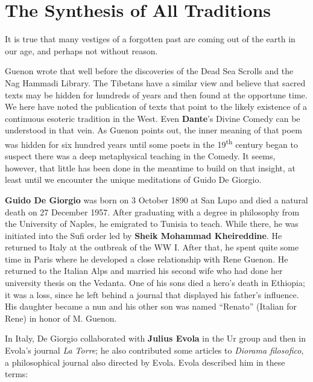 \section{The Synthesis of All Traditions}

\begin{quotex}
It is true that many vestiges of a forgotten past are coming out of the earth in our age, and perhaps not without reason.
\end{quotex}


Guenon wrote that well before the discoveries of the Dead Sea Scrolls and the Nag Hammadi Library. The Tibetans have a similar view and believe that sacred texts may be hidden for hundreds of years and then found at the opportune time. We here have noted the publication of texts that point to the likely existence of a continuous esoteric tradition in the West. Even \textbf{Dante}'s Divine Comedy can be understood in that vein. As Guenon points out, the inner meaning of that poem was hidden for six hundred years until some poets in the 19\textsuperscript{th} century began to suspect there was a deep metaphysical teaching in the Comedy. It seems, however, that little has been done in the meantime to build on that insight, at least until we encounter the unique meditations of Guido De Giorgio.

\textbf{Guido De Giorgio} was born on 3 October 1890 at San Lupo and died a natural death on 27 December 1957. After graduating with a degree in philosophy from the University of Naples, he emigrated to Tunisia to teach. While there, he was initiated into the Sufi order led by
\textbf{Sheik Mohammad Kheireddine}. He returned to Italy at the outbreak of the WW I. After that, he spent quite some time in Paris where he developed a close relationship with Rene Guenon. He returned to the Italian Alps and married his second wife who had done her university thesis on the Vedanta. One of his sons died a hero's death in Ethiopia; it was a loss, since he left behind a journal that displayed his father's influence. His daughter became a nun and his other son was named ``Renato'' (Italian for Rene) in honor of M. Guenon.

In Italy, De Giorgio collaborated with \textbf{Julius Evola} in the Ur group and then in Evola's journal \emph{La Torre}; he also contributed some articles to \emph{Diorama filosofico}, a philosophical journal also directed by Evola. Evola described him in these terms:

